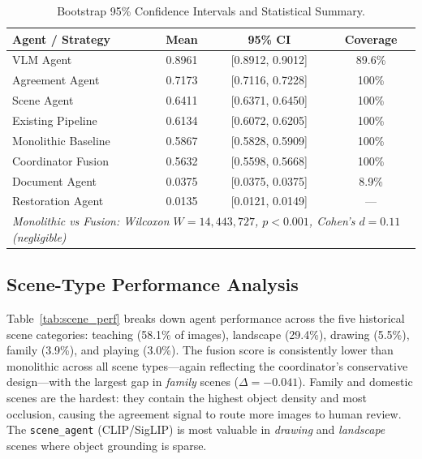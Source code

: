 \documentclass[12pt,onecolumn,a4paper]{IEEEtran}
\begin{document}
\begin{table}[!htbp]
\centering
\caption{Bootstrap 95\% Confidence Intervals and Statistical Summary.}
\label{tab:stat_summary}
\begin{tabular}{lccc}
\toprule
Agent / Strategy & Mean & 95\% CI & Coverage \\
\midrule
VLM Agent & 0.8961 & [0.8912, 0.9012] & 89.6\% \\
Agreement Agent & 0.7173 & [0.7116, 0.7228] & 100\% \\
Scene Agent & 0.6411 & [0.6371, 0.6450] & 100\% \\
Existing Pipeline & 0.6134 & [0.6072, 0.6205] & 100\% \\
Monolithic Baseline & 0.5867 & [0.5828, 0.5909] & 100\% \\
Coordinator Fusion & 0.5632 & [0.5598, 0.5668] & 100\% \\
Document Agent & 0.0375 & [0.0375, 0.0375] & 8.9\% \\
Restoration Agent & 0.0135 & [0.0121, 0.0149] & --- \\
\midrule
\multicolumn{4}{l}{\textit{Monolithic vs Fusion: Wilcoxon $W=14{,}443{,}727$, $p<0.001$, Cohen's $d=0.11$ (negligible)}} \\
\bottomrule
\end{tabular}
\end{table}

\subsection{Scene-Type Performance Analysis}
\label{sec:scene_analysis}

Table~\ref{tab:scene_perf} breaks down agent performance across the five historical scene categories: teaching (58.1\% of images), landscape (29.4\%), drawing (5.5\%), family (3.9\%), and playing (3.0\%). The fusion score is consistently lower than monolithic across all scene types---again reflecting the coordinator's conservative design---with the largest gap in \textit{family} scenes ($\Delta = -0.041$). Family and domestic scenes are the hardest: they contain the highest object density and most occlusion, causing the agreement signal to route more images to human review. The \texttt{scene\_agent} (CLIP/SigLIP) is most valuable in \textit{drawing} and \textit{landscape} scenes where object grounding is sparse.
\end{document}
